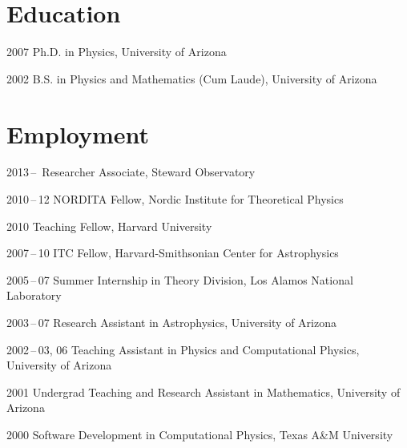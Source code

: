 \section*{Education}

\begin{tlist}

\item[2007] Ph.D. in Physics, University of Arizona

\item[2002] B.S. in Physics and Mathematics (Cum Laude), University of Arizona

\end{tlist}

\section*{Employment}

\begin{tlist}

\item[2013\,--\,] Researcher Associate, Steward Observatory

\item[2010\,--\,12] NORDITA Fellow, Nordic Institute for Theoretical Physics

\item[2010] Teaching Fellow, Harvard University

\item[2007\,--\,10] ITC Fellow, Harvard-Smithsonian Center for Astrophysics

\item[2005\,--\,07] Summer Internship in Theory Division, Los Alamos National Laboratory

\item[2003\,--\,07] Research Assistant in Astrophysics, University of Arizona

\item[2002\,--\,03, 06] Teaching Assistant in Physics and Computational Physics, University of Arizona

\item[2001] Undergrad Teaching and Research Assistant in Mathematics, University of Arizona

\item[2000] Software Development in Computational Physics, Texas A\&M University

\end{tlist}

